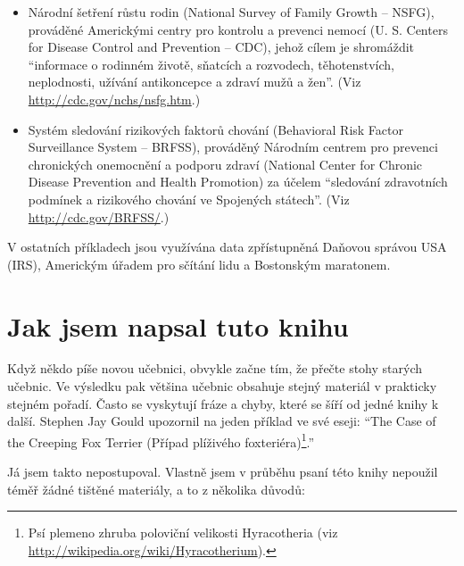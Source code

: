 \documentclass[12pt]{book}
\begin{document}
\begin{itemize}

\item Národní šetření růstu rodin (National Survey of Family Growth -- NSFG), prováděné Americkými centry pro kontrolu a prevenci nemocí (U. S. Centers for Disease Control and Prevention -- CDC), jehož cílem je shromáždit
  ``informace o rodinném životě, sňatcích a rozvodech, těhotenstvích, neplodnosti, užívání antikoncepce a zdraví mužů a žen''.
  (Viz \url{http://cdc.gov/nchs/nsfg.htm}.)

\item Systém sledování rizikových faktorů chování (Behavioral Risk Factor Surveillance System -- BRFSS),
  prováděný Národním centrem pro prevenci chronických onemocnění a podporu zdraví (National Center for Chronic Disease Prevention and Health Promotion) za účelem ``sledování zdravotních podmínek a rizikového chování ve Spojených státech''.  (Viz \url{http://cdc.gov/BRFSS/}.)

\end{itemize}

V ostatních příkladech jsou využívána data zpřístupněná Daňovou správou USA (IRS), Americkým úřadem pro sčítání lidu a Bostonským maratonem.


\section*{Jak jsem napsal tuto knihu}

Když někdo píše novou učebnici, obvykle začne tím, že přečte stohy starých učebnic. Ve výsledku pak většina učebnic obsahuje stejný materiál v prakticky stejném pořadí. Často se vyskytují fráze a chyby, které se šíří od jedné knihy k další. Stephen Jay Gould upozornil na jeden příklad ve své eseji: ``The Case of
the Creeping Fox Terrier (Případ plíživého foxteriéra)\footnote{Psí plemeno zhruba poloviční velikosti Hyracotheria (viz
  \url{http://wikipedia.org/wiki/Hyracotherium}).}.''

Já jsem takto nepostupoval. Vlastně jsem v průběhu psaní této knihy nepoužil téměř žádné tištěné materiály, a to z několika důvodů:
\end{document}

